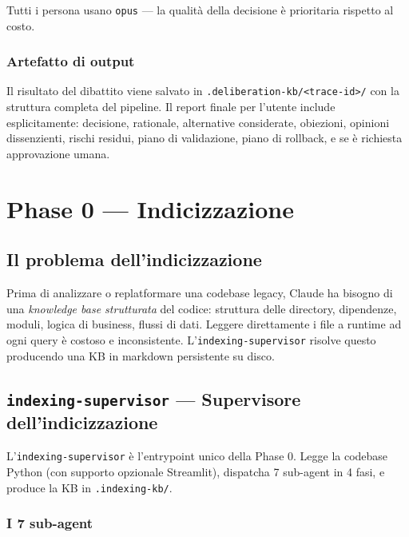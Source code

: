 \documentclass[12pt,a4paper,twoside]{book}
\begin{document}
Tutti i persona usano \texttt{opus} — la qualità della decisione è prioritaria rispetto al costo.

\subsection{Artefatto di output}

Il risultato del dibattito viene salvato in \texttt{.deliberation-kb/<trace-id>/} con la struttura completa del pipeline. Il report finale per l'utente include esplicitamente: decisione, rationale, alternative considerate, obiezioni, opinioni dissenzienti, rischi residui, piano di validazione, piano di rollback, e se è richiesta approvazione umana.

\chapter{Phase 0 — Indicizzazione}

\section{Il problema dell'indicizzazione}

Prima di analizzare o replatformare una codebase legacy, Claude ha bisogno di una \textit{knowledge base strutturata} del codice: struttura delle directory, dipendenze, moduli, logica di business, flussi di dati. Leggere direttamente i file a runtime ad ogni query è costoso e inconsistente. L'\texttt{indexing-supervisor} risolve questo producendo una KB in markdown persistente su disco.

\section{\texttt{indexing-supervisor} — Supervisore dell'indicizzazione}

L'\texttt{indexing-supervisor} è l'entrypoint unico della Phase 0. Legge la codebase Python (con supporto opzionale Streamlit), dispatcha 7 sub-agent in 4 fasi, e produce la KB in \texttt{.indexing-kb/}.

\subsection{I 7 sub-agent}
\end{document}
